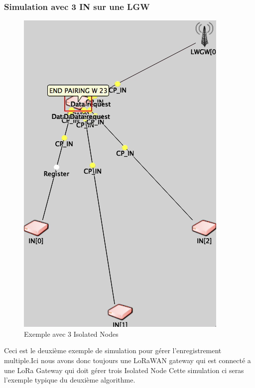 \documentclass[11pt]{article}
\begin{document}
\subsubsection{Simulation avec 3 IN sur une LGW}
\begin{figure}[!ht]
\centering
\includegraphics[scale=0.6]{3IN.png} 
\caption{Exemple avec 3 Isolated Nodes}
\end{figure}
Ceci est le deuxième exemple de simulation pour gérer l'enregistrement multiple.Ici nous avons donc toujours une LoRaWAN gateway qui est connecté a une LoRa Gateway qui doit gérer trois Isolated Node Cette simulation ci seras l'exemple typique du deuxième algorithme.
\newpage
\end{document}
